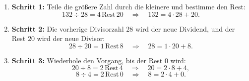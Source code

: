 \begin{enumerate}
    \item \textbf{Schritt 1:}  
    Teile die größere Zahl durch die kleinere und bestimme den Rest:  
    \[
    132 \div 28 = 4 \, \text{Rest} \, 20 \quad \Rightarrow \quad 132 = 4 \cdot 28 + 20.
    \]

    \item \textbf{Schritt 2:}  
    Die vorherige Divisorzahl $28$ wird der neue Dividend, und der Rest $20$ wird der neue Divisor:  
    \[
    28 \div 20 = 1 \, \text{Rest} \, 8 \quad \Rightarrow \quad 28 = 1 \cdot 20 + 8.
    \]

    \item \textbf{Schritt 3:}  
    Wiederhole den Vorgang, bis der Rest $0$ wird:  
    \[
    20 \div 8 = 2 \, \text{Rest} \, 4 \quad \Rightarrow \quad 20 = 2 \cdot 8 + 4,
    \]  
    \[
    8 \div 4 = 2 \, \text{Rest} \, 0 \quad \Rightarrow \quad 8 = 2 \cdot 4 + 0.
    \]
\end{enumerate}

